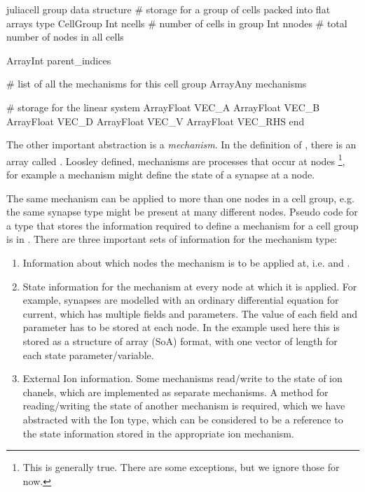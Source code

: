 \begin{inlinelisting}{julia}{cell group data structure}
# storage for a group of cells packed into flat arrays
type CellGroup
  Int ncells    # number of cells in group
  Int nnodes    # total number of nodes in all cells

  Array{Int} parent_indices

  # list of all the mechanisms for this cell group
  Array{Any} mechanisms

  # storage for the linear system
  Array{Float} VEC_A
  Array{Float} VEC_B
  Array{Float} VEC_D
  Array{Float} VEC_V
  Array{Float} VEC_RHS
end
\end{inlinelisting}

The other important abstraction is a \emph{mechanism}. In the definition of , there is an array called . Loosley defined, mechanisms are processes that occur at nodes \footnote{This is generally true. There are some exceptions, but we ignore those for now.}, for example a mechanism might define the state of a synapse at a node.

The same mechanism can be applied to more than one nodes in a cell group, e.g. the same synapse type might be present at many different nodes. Pseudo code for a type that stores the information required to define a mechanism for a cell group is in .  There are three important sets of information for the mechanism type:
\begin{enumerate}
    \item
        Information about which nodes the mechanism is to be applied at, i.e.  and .
    \item
        State information for the mechanism at every node at which it is applied. For example, synapses are modelled with an ordinary differential equation for current, which has multiple fields and parameters. The value of each field and parameter has to be stored at each node. In the example used here this is stored as a structure of array (SoA) format, with one vector of length  for each state parameter/variable.
    \item
        External Ion information.
        Some mechanisms read/write to the state of ion chanels, which are implemented as separate mechanisms.
        A method for reading/writing the state of another mechanism is required, which we have abstracted with the Ion type, which can be considered to be a reference to the state information stored in the appropriate ion mechanism.
\end{enumerate}

